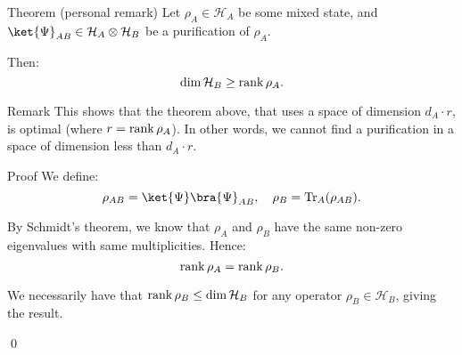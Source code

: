 \documentclass[a4paper]{article}
\begin{document}
\begin{parag}{Theorem (personal remark)}
    Let $\rho_A \in \mathcal{H}_A$ be some mixed state, and $\ket{\Psi}_{AB} \in \mathcal{H}_A \otimes \mathcal{H}_B$ be a purification of $\rho_A$.

    Then: 
    \[\dim \mathcal{H}_B \geq \operatorname{rank} \rho_A.\]

    \begin{subparag}{Remark}
        This shows that the theorem above, that uses a space of dimension $d_A \cdot r$, is optimal (where $r = \operatorname{rank} \rho_A$). In other words, we cannot find a purification in a space of dimension less than $d_A \cdot r$.
    \end{subparag}

    \begin{subparag}{Proof}
        We define: 
        \[\rho_{AB} = \ket{\Psi}\bra{\Psi}_{AB}, \mathspace \rho_B = \Tr_A\left(\rho_{AB}\right).\]

        By Schmidt's theorem, we know that $\rho_A$ and $\rho_B$ have the same non-zero eigenvalues with same multiplicities. Hence: 
        \[\operatorname{rank} \rho_A = \operatorname{rank} \rho_B.\]

        We necessarily have that $\operatorname{rank} \rho_B \leq \dim \mathcal{H}_B$ for any operator $\rho_B \in \mathcal{H}_B$, giving the result.

        \qed
    \end{subparag}
\end{parag}
\end{document}
